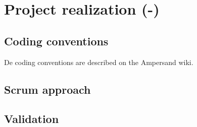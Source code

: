 \section{Project realization (-)}
\label{sec:project-realization}
%

\subsection{Coding conventions}
De coding conventions are described on the Ampersand wiki\cite{ampersand-wiki}.

\subsection{Scrum approach}
\lipsum[1]
\subsection{Validation}
\lipsum[1]